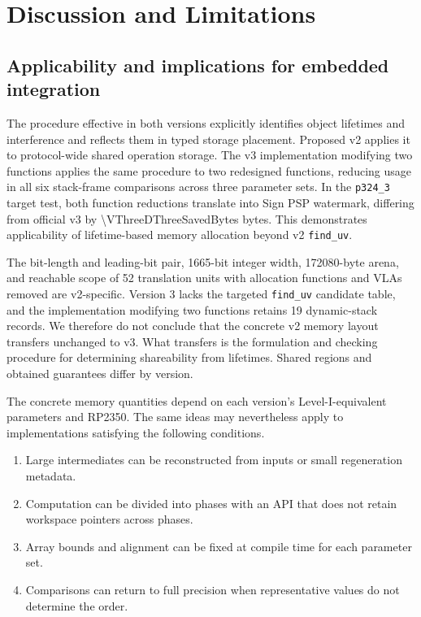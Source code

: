 \documentclass[a4paper,10pt]{article}
\theoremstyle{definition}
\theoremstyle{remark}
\begin{document}
\section{Discussion and Limitations}
\label{sec:discussion}

\subsection{Applicability and implications for embedded integration}

The procedure effective in both versions explicitly identifies object lifetimes and interference and reflects them in typed storage placement. Proposed v2 applies it to protocol-wide shared operation storage. The v3 implementation modifying two functions applies the same procedure to two redesigned functions, reducing usage in all six stack-frame comparisons across three parameter sets. In the \texttt{p324\_3} target test, both function reductions translate into Sign PSP watermark, differing from official v3 by \num{\VThreeDThreeSavedBytes} bytes. This demonstrates applicability of lifetime-based memory allocation beyond v2 \texttt{find\_uv}.

The bit-length and leading-bit pair, 1665-bit integer width, \num{172080}-byte arena, and reachable scope of 52 translation units with allocation functions and VLAs removed are v2-specific. Version 3 lacks the targeted \texttt{find\_uv} candidate table, and the implementation modifying two functions retains 19 dynamic-stack records. We therefore do not conclude that the concrete v2 memory layout transfers unchanged to v3. What transfers is the formulation and checking procedure for determining shareability from lifetimes. Shared regions and obtained guarantees differ by version.

The concrete memory quantities depend on each version's Level-I-equivalent parameters and RP2350. The same ideas may nevertheless apply to implementations satisfying the following conditions.

\begin{enumerate}[leftmargin=2.2em]
  \item Large intermediates can be reconstructed from inputs or small regeneration metadata.
  \item Computation can be divided into phases with an API that does not retain workspace pointers across phases.
  \item Array bounds and alignment can be fixed at compile time for each parameter set.
  \item Comparisons can return to full precision when representative values do not determine the order.
\end{enumerate}
\end{document}
